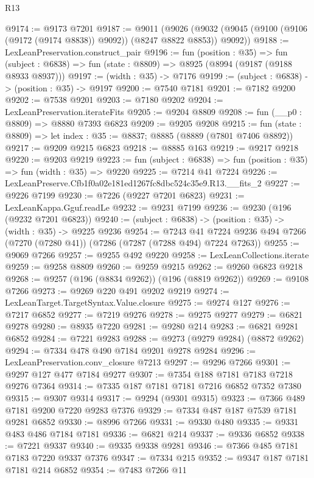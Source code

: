 \begin{lexlean}{R13}
\begin{coremodule}
@9174 := @9173 @7201
@9187 := @9011
    (@9026 (@9032 (@9045 (@9100 (@9106 (@9172 (@9174 @8838)) @9092)) (@8247 @8822 @8853)) @9092))
@9188 := LexLeanPreservation.construct_pair
@9196 := fun (position : @35) =>
  fun (subject : @6838) => fun (state : @8809) => @8925 (@8994 (@9187 (@9188 @8933 @8937)))
@9197 := (width : @35) -> @7176
@9199 := (subject : @6838) -> (position : @35) -> @9197
@9200 := @7540 @7181
@9201 := @7182 @9200
@9202 := @7538 @9201
@9203 := @7180 @9202
@9204 := LexLeanPreservation.iterateFits
@9205 := @9204 @8809
@9208 := fun (__p0 : @8809) => @8880 @7393 @6823
@9209 := @9205 @9208
@9215 := fun (state : @8809) => let index : @35 := @8837; @8885 (@8889 (@7801 @7406 @8892))
@9217 := @9209 @9215 @6823
@9218 := @8885 @163
@9219 := @9217 @9218
@9220 := @9203 @9219
@9223 := fun (subject : @6838) => fun (position : @35) => fun (width : @35) => @9220
@9225 := @7214 @41 @7224
@9226 := LexLeanPreserve.Cfb1f0a02e181ed1267fc8dbc524c35e9.R13.__fits_2
@9227 := @9226 @7199
@9230 := @7226 (@9227 @7201 @6823)
@9231 := LexLeanKappa.Gguf.readLe
@9232 := @9231 @7199
@9236 := @9230 (@196 (@9232 @7201 @6823))
@9240 := (subject : @6838) -> (position : @35) -> (width : @35) -> @9225 @9236
@9254 := @7243
    @41
    @7224
    @9236
    @494
    @7266
    (@7270 (@7280 @41))
    (@7286 (@7287 (@7288 @494) @7224 @7263))
@9255 := @9069 @7266
@9257 := @9255 @492 @9220
@9258 := LexLeanCollections.iterate
@9259 := @9258 @8809
@9260 := @9259 @9215
@9262 := @9260 @6823 @9218
@9268 := @9257 (@196 (@8834 @9262)) (@196 (@8819 @9262))
@9269 := @9108 @7266
@9273 := @9269 @220 @491 @9202 @9219
@9274 := LexLeanTarget.TargetSyntax.Value.closure
@9275 := @9274 @127
@9276 := @7217 @6852
@9277 := @7219 @9276
@9278 := @9275 @9277
@9279 := @6821 @9278
@9280 := @8935 @7220
@9281 := @9280 @214
@9283 := @6821 @9281 @6852
@9284 := @7221 @9283
@9288 := @9273 (@9279 @9284) (@8872 @9262)
@9294 := @7334 @478 @490 @7184 @9201 @9278 @9284
@9296 := LexLeanPreservation.conv_closure @7213
@9297 := @9296 @7266
@9301 := @9297 @127 @477 @7184 @9277
@9307 := @7354 @188 @7181 @7183 @7218 @9276 @7364
@9314 := @7335 @187 @7181 @7181 @7216 @6852 @7352 @7380
@9315 := @9307 @9314
@9317 := @9294 (@9301 @9315)
@9323 := @7366 @489 @7181 @9200 @7220 @9283 @7376
@9329 := @7334 @487 @187 @7539 @7181 @9281 @6852
@9330 := @8996 @7266
@9331 := @9330 @480
@9335 := @9331 @483 @486 @7184 @7181
@9336 := @6821 @214
@9337 := @9336 @6852
@9338 := @7221 @9337
@9340 := @9335 @9338 @9281
@9346 := @7366 @485 @7181 @7183 @7220 @9337 @7376
@9347 := @7334 @215
@9352 := @9347 @187 @7181 @7181 @214 @6852
@9354 := @7483 @7266 @11

\end{coremodule}
\end{lexlean}
